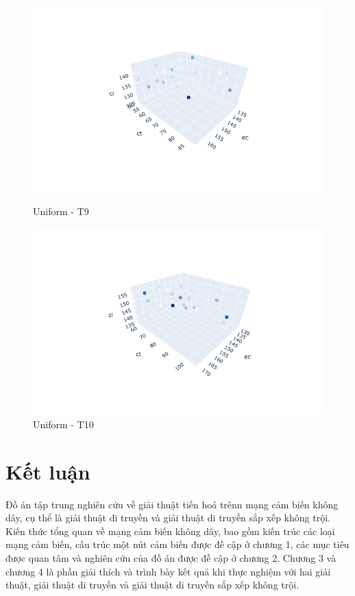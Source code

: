 \documentclass{hust}
\begin{document}
\begin{itemize}
	\begin{figure}[H]
		\begin{minipage}{0.5\textwidth}
			\centering
			\includegraphics[width=1.2\linewidth]{images/uu-dem9.png}
			\caption{Uniform - T9}\label{fig:nsga-ii-uu-dem9}
		\end{minipage}\hfill
		\begin{minipage}{0.5\textwidth}
			\centering
			\includegraphics[width=1.2\linewidth]{images/uu-dem10.png}
			\caption{Uniform - T10}\label{fig:nsga-ii-uu-dem10}
		\end{minipage}
	\end{figure}
\end{itemize}

\chapter*{Kết luận}
Đồ án tập trung nghiên cứu về giải thuật tiến hoá trênn mạng cảm biến không dây, cụ thể là giải thuật di truyền và giải thuật di truyền sắp xếp không trội. Kiến thức tổng quan về mạng cảm biến không dây, bao gồm kiến trúc các loại mạng cảm biến, cấu trúc một nút cảm biến được đề cập ở chương 1, các mục tiêu được quan tâm và nghiên cứu của đồ án được đề cập ở chương 2. Chương 3 và chương 4 là phần giải thích và trình bày kết quả khi thực nghiệm với hai giải thuật, giải thuật di truyền và giải thuật di truyền sắp xếp không trội.
\end{document}
